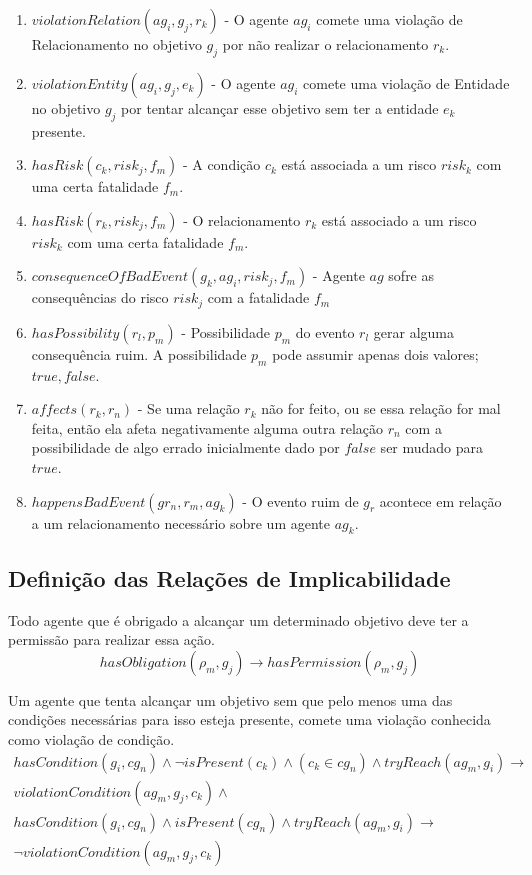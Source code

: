 \documentclass[12pt]{article}
\begin{document}
\begin{enumerate}
	\item $violationRelation(ag_i,g_j,r_k)$ - O agente $ag_i$ comete uma violação de Relacionamento no objetivo $g_j$ por não realizar o relacionamento $r_k$. 
	\item $violationEntity(ag_i,g_j,e_k)$ - O agente $ag_i$ comete uma violação de Entidade no objetivo $g_j$ por tentar alcançar esse objetivo sem ter a entidade $e_k$ presente.  	
	\item $hasRisk(c_k,risk_j,f_m)$ - A condição $c_k$ está associada a um risco $risk_k$ com uma certa fatalidade $f_m$. 
	\item $hasRisk(r_k,risk_j,f_m)$ - O relacionamento $r_k$ está associado a um risco $risk_k$ com uma certa fatalidade $f_m$.
	\item $consequenceOfBadEvent(g_k,ag_i,risk_j,f_m)$ - Agente $ag$ sofre as consequências do risco $risk_j$ com a fatalidade $f_m$
	\item $hasPossibility(r_l,p_m)$ - Possibilidade $p_m$ do evento $r_l$ gerar alguma consequência ruim. A possibilidade $p_m$ pode assumir apenas dois valores; $true,false$. 	
	\item $affects(r_k,r_n)$ - Se uma relação $r_k$ não for feito, ou se essa relação for mal feita, então ela afeta negativamente alguma outra relação $r_n$ com a possibilidade de algo errado inicialmente dado por $false$ ser mudado para $true$. 	
	\item $happensBadEvent(gr_n,r_m,ag_k)$ - O evento ruim de $g_r$ acontece em relação a um relacionamento necessário sobre um agente $ag_k$. 		
\end{enumerate}

\subsection{Definição das Relações de Implicabilidade}

Todo agente que é obrigado a alcançar um determinado objetivo deve ter a permissão para realizar essa ação.
\begin{equation}\label{rel1}
	hasObligation(\rho_m,g_j) \to hasPermission(\rho_m,g_j)  
\end{equation}

Um agente que tenta alcançar um objetivo sem que pelo menos uma das condições necessárias para isso esteja presente, comete uma violação conhecida como violação de condição.
\begin{eqnarray}\label{rel3}\nonumber
	hasCondition(g_i,cg_n) \wedge \neg isPresent(c_k) \wedge (c_k \in cg_n) \wedge tryReach(ag_m,g_i) \to \nonumber \\  
	violationCondition(ag_m,g_j,c_k) \wedge \nonumber \\
	hasCondition(g_i,cg_n) \wedge isPresent(cg_n) \wedge tryReach(ag_m,g_i) \to \nonumber \\  
	\neg violationCondition(ag_m,g_j,c_k)  	
\end{eqnarray}
\end{document}
